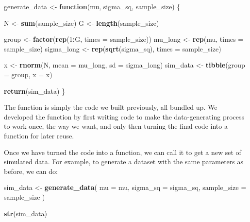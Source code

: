 \documentclass[
]{book}
\newenvironment{Shaded}{\begin{snugshade}}{\end{snugshade}}
\newcommand{\AttributeTok}[1]{\textcolor[rgb]{0.13,0.29,0.53}{#1}}
\newcommand{\ControlFlowTok}[1]{\textcolor[rgb]{0.13,0.29,0.53}{\textbf{#1}}}
\newcommand{\DecValTok}[1]{\textcolor[rgb]{0.00,0.00,0.81}{#1}}
\newcommand{\FunctionTok}[1]{\textcolor[rgb]{0.13,0.29,0.53}{\textbf{#1}}}
\newcommand{\NormalTok}[1]{#1}
\newcommand{\OtherTok}[1]{\textcolor[rgb]{0.56,0.35,0.01}{#1}}
\newcommand{\SpecialCharTok}[1]{\textcolor[rgb]{0.81,0.36,0.00}{\textbf{#1}}}
\begin{document}
\begin{Shaded}
\begin{Highlighting}[]
\NormalTok{generate\_data }\OtherTok{\textless{}{-}} \ControlFlowTok{function}\NormalTok{(mu, sigma\_sq, sample\_size) \{}

\NormalTok{  N }\OtherTok{\textless{}{-}} \FunctionTok{sum}\NormalTok{(sample\_size)}
\NormalTok{  G }\OtherTok{\textless{}{-}} \FunctionTok{length}\NormalTok{(sample\_size)}

\NormalTok{  group }\OtherTok{\textless{}{-}} \FunctionTok{factor}\NormalTok{(}\FunctionTok{rep}\NormalTok{(}\DecValTok{1}\SpecialCharTok{:}\NormalTok{G, }\AttributeTok{times =}\NormalTok{ sample\_size))}
\NormalTok{  mu\_long }\OtherTok{\textless{}{-}} \FunctionTok{rep}\NormalTok{(mu, }\AttributeTok{times =}\NormalTok{ sample\_size)}
\NormalTok{  sigma\_long }\OtherTok{\textless{}{-}} \FunctionTok{rep}\NormalTok{(}\FunctionTok{sqrt}\NormalTok{(sigma\_sq), }\AttributeTok{times =}\NormalTok{ sample\_size)}

\NormalTok{  x }\OtherTok{\textless{}{-}} \FunctionTok{rnorm}\NormalTok{(N, }\AttributeTok{mean =}\NormalTok{ mu\_long, }\AttributeTok{sd =}\NormalTok{ sigma\_long)}
\NormalTok{  sim\_data }\OtherTok{\textless{}{-}} \FunctionTok{tibble}\NormalTok{(}\AttributeTok{group =}\NormalTok{ group, }\AttributeTok{x =}\NormalTok{ x)}

  \FunctionTok{return}\NormalTok{(sim\_data)}
\NormalTok{\}}
\end{Highlighting}
\end{Shaded}

The function is simply the code we built previously, all bundled up.
We developed the function by first writing code to make the data-generating process to work once, the way we want, and only then turning the final code into a function for later reuse.

Once we have turned the code into a function, we can call it to get a new set of simulated data.
For example, to generate a dataset with the same parameters as before, we can do:

\begin{Shaded}
\begin{Highlighting}[]
\NormalTok{sim\_data }\OtherTok{\textless{}{-}} \FunctionTok{generate\_data}\NormalTok{(}
  \AttributeTok{mu =}\NormalTok{ mu, }
  \AttributeTok{sigma\_sq =}\NormalTok{ sigma\_sq,}
  \AttributeTok{sample\_size =}\NormalTok{ sample\_size}
\NormalTok{)}

\FunctionTok{str}\NormalTok{(sim\_data)}
\end{Highlighting}
\end{Shaded}
\end{document}
